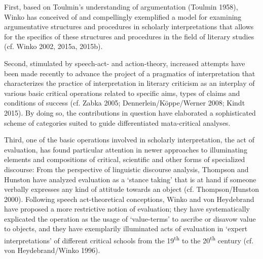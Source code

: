 First, based on Toulmin's understanding of argumentation (Toulmin 1958), Winko has conceived of and compellingly exemplified a model for examining argumentative structures and procedures in scholarly interpretations that allows for the specifics of these structures and procedures in the field of literary studies (cf. Winko 2002, 2015a, 2015b).

Second, stimulated by speech-act- and action-theory, increased attempts have been made recently to advance the project of a pragmatics of interpretation that characterizes the practice of interpretation in literary criticism as an interplay of various basic critical operations related to specific aims, types of claims and conditions of success (cf. Zabka 2005; Dennerlein/K\"oppe/Werner 2008; Kindt 2015). By doing so, the contributions in question have elaborated a sophisticated scheme of categories suited to guide differentiated mata-critical analyses. 

Third, one of the basic operations involved in scholarly interpretation, the act of evaluation, has found particular attention in newer approaches to illuminating elements and compositions of critical, scientific and other forms of specialized discourse: From the perspective of linguistic discourse analysis, Thompson and Hunston have analyzed evaluation as a `stance taking' that is at hand if someone verbally expresses any kind of attitude towards an object (cf. Thompson/Hunston 2000). Following speech act-theoretical conceptions, Winko and von Heydebrand have proposed a more restrictive notion of evaluation; they have systematically explicated the operation as the usage of `value-terms' to ascribe or disavow value to objects, and they have exemplarily illuminated acts of evaluation in `expert interpretations' of different critical schools from the 19\textsuperscript{th} to the 20\textsuperscript{th} century (cf. von Heydebrand/Winko 1996).

